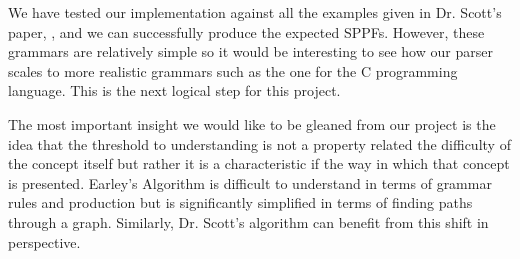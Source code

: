 \documentclass{sigplanconf}
\begin{document}
We have tested our implementation against all the examples given in Dr. Scott's paper, \cite{scott}, and we can successfully produce the expected SPPFs. However, these grammars are relatively simple so it would be interesting to see how our parser scales to more realistic grammars such as the one for the C programming language.  This is the next logical step for this project.

The most important insight we would like to be gleaned from our project is the idea that the threshold to understanding is not a property related the difficulty of the concept itself but rather it is a characteristic if the way in which that concept is presented. Earley's Algorithm is difficult to understand in terms of grammar rules and production but is significantly simplified in terms of  finding paths through a graph. Similarly, Dr. Scott's algorithm can benefit from this shift in perspective.
\end{document}
